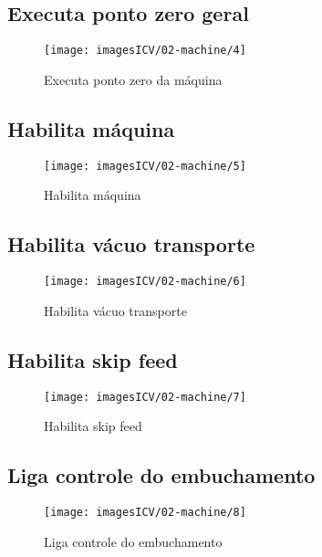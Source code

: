 \subsection{Executa ponto zero geral}
\begin{figure}
    \centering
    \texttt{[image: imagesICV/02-machine/4]}
    \caption{Executa ponto zero da máquina}
    \label{fig:}
\end{figure}
\newpage
\thispagestyle{fancy}
\vspace{\fill}

\subsection{Habilita máquina}
\begin{figure}
    \centering
    \texttt{[image: imagesICV/02-machine/5]}
    \caption{Habilita máquina}
    \label{fig:}
\end{figure}
\newpage
\thispagestyle{fancy}
\vspace{\fill}

\subsection{Habilita vácuo transporte}
\begin{figure}
    \centering
    \texttt{[image: imagesICV/02-machine/6]}
    \caption{Habilita vácuo transporte}
    \label{fig:}
\end{figure}
\newpage
\thispagestyle{fancy}
\vspace{\fill}

\subsection{Habilita skip feed}
\begin{figure}
    \centering
    \texttt{[image: imagesICV/02-machine/7]}
    \caption{Habilita skip feed}
    \label{fig:}
\end{figure}
\newpage
\thispagestyle{fancy}
\vspace{\fill}

\subsection{Liga controle do embuchamento}
\begin{figure}
    \centering
    \texttt{[image: imagesICV/02-machine/8]}
    \caption{Liga controle do embuchamento}
    \label{fig:}
\end{figure}


